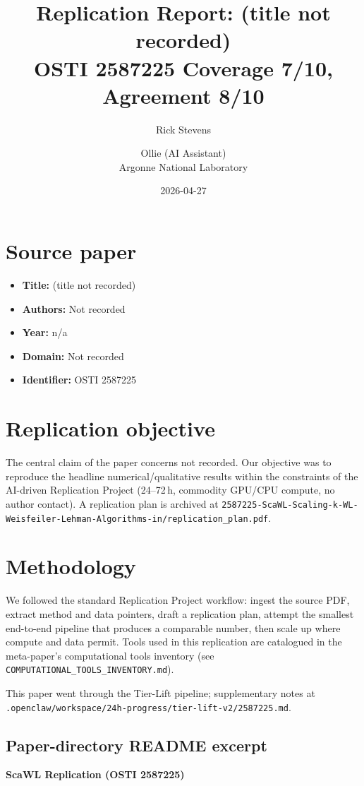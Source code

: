 \documentclass[11pt]{article}
\title{Replication Report: (title not recorded)\\[2pt]\large OSTI 2587225 \textbar{} Coverage 7/10, Agreement 8/10}
\author{Rick Stevens \and Ollie (AI Assistant)\\\small Argonne National Laboratory}
\date{2026-04-27}
\begin{document}
\maketitle

\section{Source paper}
\begin{itemize}
\item \textbf{Title:} (title not recorded)
\item \textbf{Authors:} Not recorded
\item \textbf{Year:} n/a
\item \textbf{Domain:} Not recorded
\item \textbf{Identifier:} OSTI 2587225
\end{itemize}


\section{Replication objective}
The central claim of the paper concerns not recorded. Our objective was to reproduce the headline numerical/qualitative results within the constraints of the AI-driven Replication Project (24--72\,h, commodity GPU/CPU compute, no author contact). A replication plan is archived at \texttt{2587225-ScaWL-Scaling-k-WL-Weisfeiler-Lehman-Algorithms-in/replication\_plan.pdf}.

\section{Methodology}
We followed the standard Replication Project workflow: ingest the source PDF, extract method and data pointers, draft a replication plan, attempt the smallest end-to-end pipeline that produces a comparable number, then scale up where compute and data permit. Tools used in this replication are catalogued in the meta-paper's computational tools inventory (see \texttt{COMPUTATIONAL\_TOOLS\_INVENTORY.md}).

This paper went through the Tier-Lift pipeline; supplementary notes at \texttt{.openclaw/workspace/24h-progress/tier-lift-v2/2587225.md}.

\subsection*{Paper-directory README excerpt}
\small
\par\medskip\textbf{ScaWL Replication (OSTI 2587225)}\par
\end{document}
